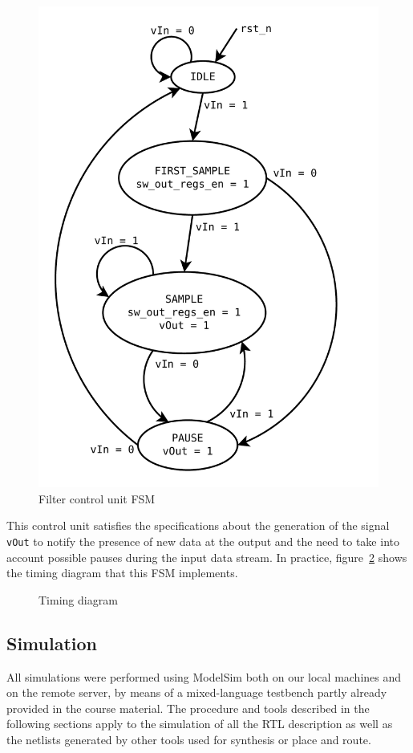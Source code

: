 \documentclass[a4paper]{article}
\begin{document}
\begin{figure}[hbtp]
    \centering
    \includegraphics[width=.5\linewidth]{media/fsm.pdf}
    \caption{Filter control unit FSM}
    \label{fig:fsm}
\end{figure}

This control unit satisfies the specifications about the generation of the signal \texttt{vOut} to notify the presence of new data at the output and the need to take into account possible pauses during the input data stream. In practice, figure~\ref{fig:timing} shows the timing diagram that this FSM implements.

\begin{figure}[hbtp]
    \centering
    \caption{Timing diagram}
    \label{fig:timing}
\end{figure}

\subsection{Simulation}
All simulations were performed using ModelSim both on our local machines and on the remote server, by means of a mixed-language testbench partly already provided in the course material. The procedure and tools described in the following sections apply to the simulation of all the RTL description as well as the netlists generated by other tools used for synthesis or place and route.
\end{document}
